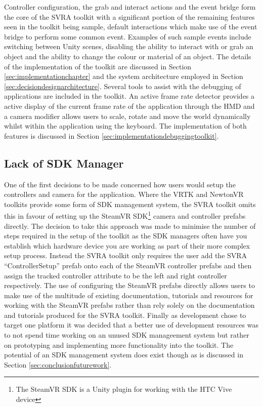 \documentclass{l4proj}
\begin{document}
Controller configuration, the grab and interact actions and the event bridge form the core of the SVRA toolkit with a significant portion of the remaining features seen in the toolkit being sample, default interactions which make use of the event bridge to perform some common event. Examples of such sample events include switching between Unity scenes, disabling the ability to interact with or grab an object and the ability to change the colour or material of an object. The details of the implementation of the toolkit are discussed in Section \ref{sec:implementationchapter} and the system architecture employed in Section \ref{sec:decisiondesignarchitecture}. Several tools to assist with the debugging of applications are included in the toolkit. An active frame rate detector provides a active display of the current frame rate of the application through the HMD and a camera modifier allows users to scale, rotate and move the world dynamically whilst within the application using the keyboard. The implementation of both features is discussed in Section \ref{sec:implementationdebuggingtoolkit}.

\subsection{Lack of SDK Manager}
\label{sec:decisionnosdkmanager}
One of the first decisions to be made concerned how users would setup the controllers and camera for the application. Where the VRTK and NewtonVR toolkits provide some form of SDK management system, the SVRA toolkit omits this in favour of setting up the SteamVR SDK\footnote{The SteamVR SDK is a Unity plugin for working with the HTC Vive device} camera and controller prefabs directly. The decision to take this approach was made to minimise the number of steps required in the setup of the toolkit as the SDK managers often have you establish which hardware device you are working as part of their more complex setup process. Instead the SVRA toolkit only requires the user add the SVRA ``ControllerSetup'' prefab onto each of the SteamVR controller prefabs and then assign the tracked controller attribute to be the left and right controller respectively. The use of configuring the SteamVR prefabs directly allows users to make use of the multitude of existing documentation, tutorials and resources for working with the SteamVR prefabs rather than rely solely on the documentation and tutorials produced for the SVRA toolkit. Finally as development chose to target one platform it was decided that a better use of development resources was to not spend time working on an unused SDK manageement system but rather on prototyping and implementing more functionality into the toolkit. The potential of an SDK management system does exist though as is discussed in Section \ref{sec:conclusionfuturework}.
\end{document}
